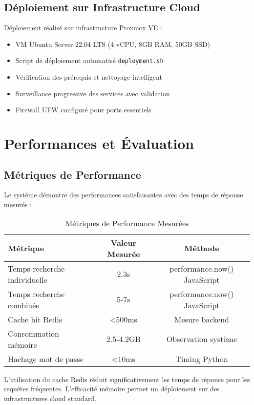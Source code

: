 \documentclass[12pt,a4paper]{article}
\begin{document}
\subsection{Déploiement sur Infrastructure Cloud}

\begin{implementedbox}
Déploiement réalisé sur infrastructure Proxmox VE :
\begin{itemize}
  \item VM Ubuntu Server 22.04 LTS (4 vCPU, 8GB RAM, 50GB SSD)
  \item Script de déploiement automatisé \texttt{deployment.sh}
  \item Vérification des prérequis et nettoyage intelligent
  \item Surveillance progressive des services avec validation
  \item Firewall UFW configuré pour ports essentiels
\end{itemize}
\end{implementedbox}

\section{Performances et Évaluation}

\subsection{Métriques de Performance}

\begin{implementedbox}
Le système démontre des performances satisfaisantes avec des temps de réponse mesurés :

\begin{table}[H]
\centering
\begin{tabular}{|l|c|c|}
\hline
\textbf{Métrique} & \textbf{Valeur Mesurée} & \textbf{Méthode} \\
\hline
Temps recherche individuelle & 2.3s & performance.now() JavaScript \\
Temps recherche combinée & 5-7s & performance.now() JavaScript \\
Cache hit Redis & <500ms & Mesure backend \\
Consommation mémoire & 2.5-4.2GB & Observation système \\
Hachage mot de passe & <10ms & Timing Python \\
\hline
\end{tabular}
\caption{Métriques de Performance Mesurées}
\end{table}

L'utilisation du cache Redis réduit significativement les temps de réponse pour les requêtes fréquentes. L'efficacité mémoire permet un déploiement sur des infrastructures cloud standard.
\end{implementedbox}
\end{document}
